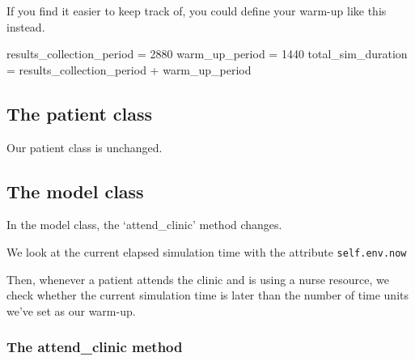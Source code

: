 \documentclass[
  letterpaper,
  DIV=11,
  numbers=noendperiod]{scrreprt}
\newenvironment{Shaded}{}{}
\newcommand{\DecValTok}[1]{\textcolor[rgb]{0.00,0.36,0.77}{#1}}
\newcommand{\NormalTok}[1]{\textcolor[rgb]{0.14,0.16,0.18}{#1}}
\newcommand{\OperatorTok}[1]{\textcolor[rgb]{0.14,0.16,0.18}{#1}}
\begin{document}
\begin{tcolorbox}[enhanced jigsaw, colframe=quarto-callout-tip-color-frame, bottomtitle=1mm, breakable, rightrule=.15mm, coltitle=black, colbacktitle=quarto-callout-tip-color!10!white, opacityback=0, leftrule=.75mm, arc=.35mm, toptitle=1mm, title=\textcolor{quarto-callout-tip-color}{\faLightbulb}\hspace{0.5em}{Tip}, titlerule=0mm, colback=white, toprule=.15mm, bottomrule=.15mm, left=2mm, opacitybacktitle=0.6]

If you find it easier to keep track of, you could define your warm-up
like this instead.

\label{g_class_alt}
\begin{Shaded}
\begin{Highlighting}[]
\NormalTok{results\_collection\_period }\OperatorTok{=} \DecValTok{2880}
\NormalTok{warm\_up\_period }\OperatorTok{=} \DecValTok{1440}
\NormalTok{total\_sim\_duration }\OperatorTok{=}\NormalTok{ results\_collection\_period }\OperatorTok{+}\NormalTok{ warm\_up\_period}
\end{Highlighting}
\end{Shaded}

\end{tcolorbox}

\subsection{The patient class}\label{the-patient-class-2}

Our patient class is unchanged.

\subsection{The model class}\label{the-model-class-2}

In the model class, the `attend\_clinic' method changes.

We look at the current elapsed simulation time with the attribute
\texttt{self.env.now}

Then, whenever a patient attends the clinic and is using a nurse
resource, we check whether the current simulation time is later than the
number of time units we've set as our warm-up.

\subsubsection{The attend\_clinic
method}\label{the-attend_clinic-method-1}
\end{document}
